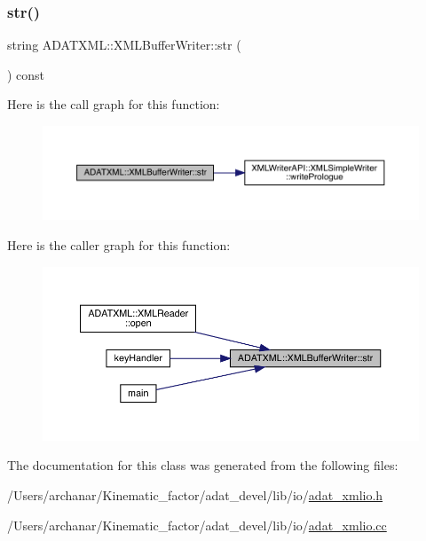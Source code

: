 \subsubsection{\texorpdfstring{str()}{str()}\hspace{0.1cm}{\footnotesize\ttfamily [2/2]}}
{\footnotesize\ttfamily string A\+D\+A\+T\+X\+M\+L\+::\+X\+M\+L\+Buffer\+Writer\+::str (\begin{DoxyParamCaption}{ }\end{DoxyParamCaption}) const}

Here is the call graph for this function\+:\nopagebreak
\begin{figure}[H]
\begin{center}
\leavevmode
\includegraphics[width=350pt]{d7/de9/classADATXML_1_1XMLBufferWriter_a3980a9a10a3616f76b7403c69c4006f0_cgraph}
\end{center}
\end{figure}
Here is the caller graph for this function\+:\nopagebreak
\begin{figure}[H]
\begin{center}
\leavevmode
\includegraphics[width=350pt]{d7/de9/classADATXML_1_1XMLBufferWriter_a3980a9a10a3616f76b7403c69c4006f0_icgraph}
\end{center}
\end{figure}


The documentation for this class was generated from the following files\+:\begin{DoxyCompactItemize}
\item 
/\+Users/archanar/\+Kinematic\+\_\+factor/adat\+\_\+devel/lib/io/\mbox{\hyperlink{lib_2io_2adat__xmlio_8h}{adat\+\_\+xmlio.\+h}}\item 
/\+Users/archanar/\+Kinematic\+\_\+factor/adat\+\_\+devel/lib/io/\mbox{\hyperlink{adat__xmlio_8cc}{adat\+\_\+xmlio.\+cc}}\end{DoxyCompactItemize}
